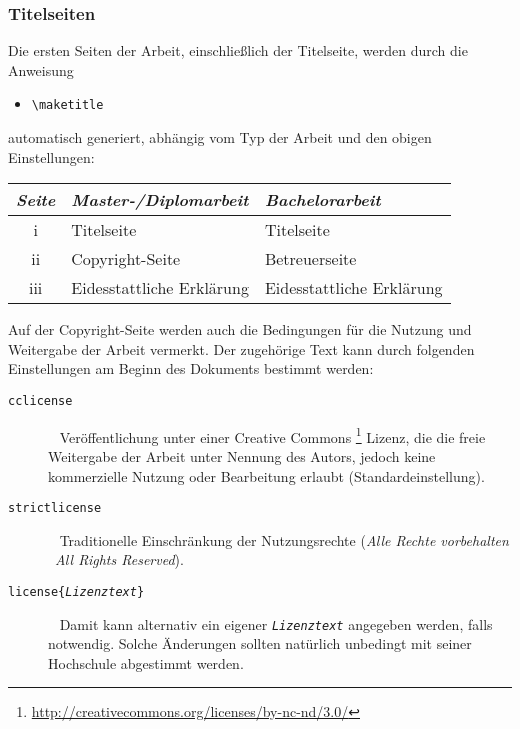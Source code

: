 \subsubsection{Titelseiten}

Die ersten Seiten der Arbeit, einschließlich der Titelseite,
werden durch die Anweisung
\begin{itemize}
\item[] \verb!\maketitle!  
\end{itemize}
automatisch generiert, abhängig vom Typ der Arbeit und den obigen
Einstellungen:
%
\begin{center}
\begin{tabular}{cll}
\emph{Seite} & \emph{Master-/Diplomarbeit} & \emph{Bachelorarbeit} \\
  \hline
  \textrm{i} & Titelseite & Titelseite \\
  \textrm{ii} & Copyright-Seite & Betreuerseite \\
  \textrm{iii} & Eidesstattliche Erklärung & Eidesstattliche Erklärung \\
  \hline
\end{tabular}
\end{center}
%
Auf der Copyright-Seite werden auch die Bedingungen für die Nutzung 
und Weitergabe der Arbeit vermerkt. Der zugehörige Text kann durch
folgenden Einstellungen am Beginn des Dokuments bestimmt werden:
%
\begin{description}
\item[\normalfont\texttt{{\bs}cclicense}] ~ \newline
	Veröffentlichung unter einer Creative Commons%
	\footnote{\url{http://creativecommons.org/licenses/by-nc-nd/3.0/}}
	Lizenz, die die freie Weitergabe der Arbeit unter Nennung des Autors, jedoch
	keine kommerzielle Nutzung oder Bearbeitung erlaubt
	(Standardeinstellung).
\item[\normalfont\texttt{{\bs}strictlicense}] ~ \newline 
	Traditionelle Einschränkung der Nutzungsrechte 
	(\emph{Alle Rechte vorbehalten} \bzw\ \emph{All Rights Reserved}).
\item[\normalfont\texttt{{\bs}license\{\emph{Lizenztext}\}}] ~ \newline
	Damit kann alternativ ein eigener \texttt{\emph{Lizenztext}} angegeben werden, 
	falls notwendig. Solche Änderungen sollten natürlich unbedingt mit seiner 
	Hochschule abgestimmt werden.
\end{description}






